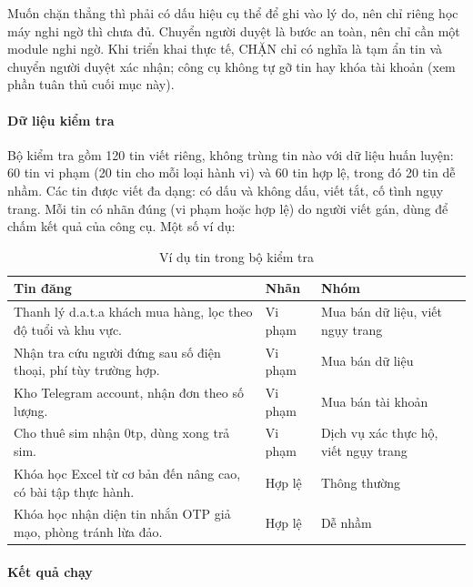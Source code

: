 Muốn chặn thẳng thì phải có dấu hiệu cụ thể để ghi vào lý do, nên chỉ riêng học máy nghi ngờ thì chưa đủ. Chuyển người duyệt là bước an toàn, nên chỉ cần một module nghi ngờ. Khi triển khai thực tế, CHẶN chỉ có nghĩa là tạm ẩn tin và chuyển người duyệt xác nhận; công cụ không tự gỡ tin hay khóa tài khoản (xem phần tuân thủ cuối mục này).

\paragraph{Dữ liệu kiểm tra}

Bộ kiểm tra gồm 120 tin viết riêng, không trùng tin nào với dữ liệu huấn luyện: 60 tin vi phạm (20 tin cho mỗi loại hành vi) và 60 tin hợp lệ, trong đó 20 tin dễ nhầm. Các tin được viết đa dạng: có dấu và không dấu, viết tắt, cố tình ngụy trang. Mỗi tin có nhãn đúng (vi phạm hoặc hợp lệ) do người viết gán, dùng để chấm kết quả của công cụ. Một số ví dụ:

{\small{}
\begin{table}[H]
\centering
\caption{Ví dụ tin trong bộ kiểm tra}\label{tab:5.8}
\begin{tabularx}{\textwidth}{>{\hsize=1.408\hsize\raggedright\arraybackslash}X>{\raggedright\arraybackslash}l>{\hsize=0.592\hsize\raggedright\arraybackslash}X}
\toprule
\textbf{Tin đăng} & \textbf{Nhãn} & \textbf{Nhóm} \\
\midrule
Thanh lý d.a.t.a khách mua hàng, lọc theo độ tuổi và khu vực. & Vi phạm & Mua bán dữ liệu, viết ngụy trang \\
Nhận tra cứu người đứng sau số điện thoại, phí tùy trường hợp. & Vi phạm & Mua bán dữ liệu \\
Kho Telegram account, nhận đơn theo số lượng. & Vi phạm & Mua bán tài khoản \\
Cho thuê sim nhận 0tp, dùng xong trả sim. & Vi phạm & Dịch vụ xác thực hộ, viết ngụy trang \\
Khóa học Excel từ cơ bản đến nâng cao, có bài tập thực hành. & Hợp lệ & Thông thường \\
Khóa học nhận diện tin nhắn OTP giả mạo, phòng tránh lừa đảo. & Hợp lệ & Dễ nhầm \\
\bottomrule
\end{tabularx}
\end{table}}

\paragraph{Kết quả chạy}

